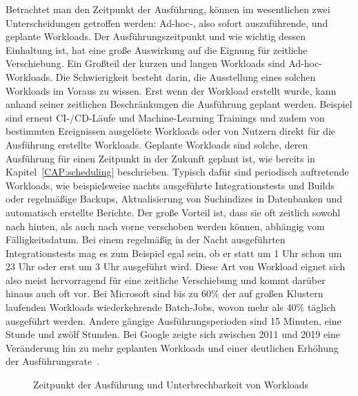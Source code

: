 Betrachtet man den Zeitpunkt der Ausführung, können im wesentlichen zwei Unterscheidungen getroffen werden:
Ad-hoc-, also sofort auszuführende, und geplante Workloads.
Der Ausführungszeitpunkt und wie wichtig dessen Einhaltung ist, hat eine große Auswirkung auf die Eignung für zeitliche Verschiebung.
Ein Großteil der kurzen und langen Workloads sind Ad-hoc-Workloads.
Die Schwierigkeit besteht darin, die Ausstellung eines solchen Workloads im Voraus zu wissen.
Erst wenn der Workload erstellt wurde, kann anhand seiner zeitlichen Beschränkungen die Ausführung geplant werden.
Beispiel sind erneut CI-/CD-Läufe und Machine-Learning Trainings und zudem von bestimmten Ereignissen ausgelöste Workloads oder von Nutzern direkt für die Ausführung erstellte Workloads.
Geplante Workloads sind solche, deren Ausführung für einen Zeitpunkt in der Zukunft geplant ist, wie bereits in Kapitel~\ref{CAP:scheduling} beschrieben.
Typisch dafür sind periodisch auftretende Workloads, wie beispielsweise nachts ausgeführte Integrationstests und Builds oder regelmäßige Backups, Aktualisierung von Suchindizes in Datenbanken und automatisch erstellte Berichte.
Der große Vorteil ist, dass sie oft zeitlich sowohl nach hinten, als auch nach vorne verschoben werden können, abhängig vom Fälligkeitsdatum.
Bei einem regelmäßig in der Nacht ausgeführten Integrationstests mag es zum Beispiel egal sein, ob er statt um 1 Uhr schon um 23 Uhr oder erst um 3 Uhr ausgeführt wird.
Diese Art von Workload eignet sich also meist hervorragend für eine zeitliche Verschiebung und kommt darüber hinaus auch oft vor.
Bei Microsoft sind bis zu 60\% der auf großen Klustern laufenden Workloads wiederkehrende Batch-Jobs, wovon mehr als 40\% täglich ausgeführt werden.
Andere gängige Ausführungsperioden sind 15 Minuten, eine Stunde und zwölf Stunden.
Bei Google zeigte sich zwischen 2011 und 2019 eine Veränderung hin zu mehr geplanten Workloads und einer deutlichen Erhöhung der Ausführungsrate~\cite{Wiesner.2021}.
\begin{figure}
 \centering
 \qquad
 \caption[Zeitpunkt der Ausführung und Unterbrechbarkeit von Workloads]{Zeitpunkt der Ausführung und Unterbrechbarkeit von Workloads}%
 \label{FIG:workloads-execution-time-interruptibility}%
\end{figure}

